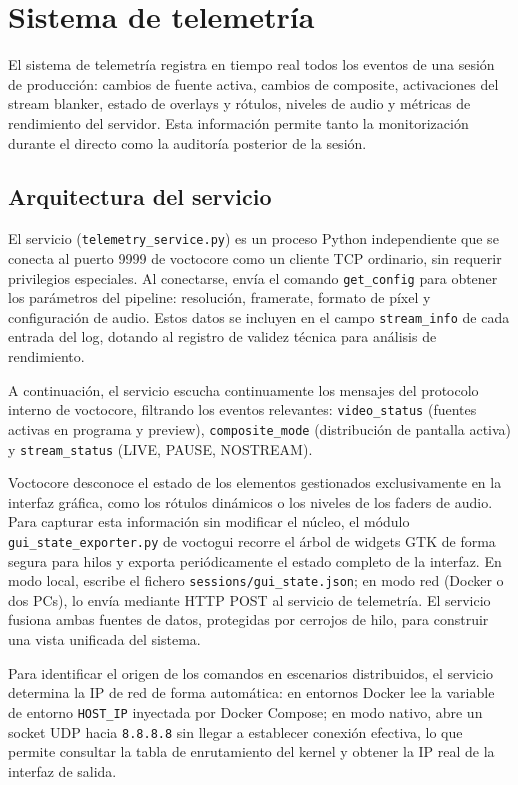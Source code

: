 \section{Sistema de telemetría}
\label{sec:telemetria}

El sistema de telemetría registra en tiempo real todos los eventos de una sesión de
producción: cambios de fuente activa, cambios de composite, activaciones del stream
blanker, estado de overlays y rótulos, niveles de audio y métricas de rendimiento del
servidor. Esta información permite tanto la monitorización durante el directo como la
auditoría posterior de la sesión.

\subsection{Arquitectura del servicio}

El servicio (\texttt{telemetry\_service.py}) es un proceso Python independiente que
se conecta al puerto 9999 de voctocore como un cliente TCP ordinario, sin requerir
privilegios especiales. Al conectarse, envía el comando \texttt{get\_config} para
obtener los parámetros del pipeline: resolución, framerate, formato de píxel y
configuración de audio. Estos datos se incluyen en el campo \texttt{stream\_info} de
cada entrada del log, dotando al registro de validez técnica para análisis de rendimiento.

A continuación, el servicio escucha continuamente los mensajes del protocolo interno
de voctocore, filtrando los eventos relevantes: \texttt{video\_status} (fuentes activas
en programa y preview), \texttt{composite\_mode} (distribución de pantalla activa) y
\texttt{stream\_status} (LIVE, PAUSE, NOSTREAM).

Voctocore desconoce el estado de los elementos gestionados exclusivamente en la
interfaz gráfica, como los rótulos dinámicos o los niveles de los faders de audio.
Para capturar esta información sin modificar el núcleo, el módulo
\texttt{gui\_state\_exporter.py} de voctogui recorre el árbol de widgets GTK de forma
segura para hilos y exporta periódicamente el estado completo de la interfaz. En modo
local, escribe el fichero \texttt{sessions/gui\_state.json}; en modo red (Docker o dos
PCs), lo envía mediante HTTP POST al servicio de telemetría. El servicio fusiona ambas
fuentes de datos, protegidas por cerrojos de hilo, para construir una vista unificada
del sistema.

Para identificar el origen de los comandos en escenarios distribuidos, el servicio
determina la IP de red de forma automática: en entornos Docker lee la variable de
entorno \texttt{HOST\_IP} inyectada por Docker Compose; en modo nativo, abre un socket
UDP hacia \texttt{8.8.8.8} sin llegar a establecer conexión efectiva, lo que permite
consultar la tabla de enrutamiento del kernel y obtener la IP real de la interfaz de
salida.

